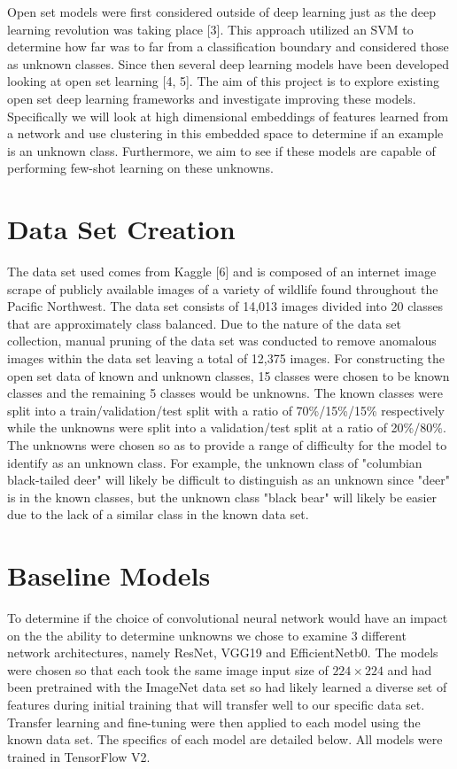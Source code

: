\documentclass[conference]{IEEEtran}
\begin{document}
Open set models were first considered outside of deep learning just as the deep learning revolution was taking place [3]. This approach utilized an SVM to determine how far was to far from a classification boundary and considered those as unknown classes. Since then several deep learning models have been developed looking at open set learning [4, 5]. The aim of this project is to explore existing open set deep learning frameworks and investigate improving these models. Specifically we will look at high dimensional embeddings of features learned from a network and use clustering in this embedded space to determine if an example is an unknown class. Furthermore, we aim to see if these models are capable of performing few-shot learning on these unknowns.

\section{Data Set Creation}

The data set used comes from Kaggle [6] and is composed of an internet image scrape of publicly available images of a variety of wildlife found throughout the Pacific Northwest. The data set consists of 14,013 images divided into 20 classes that are approximately class balanced. Due to the nature of the data set collection, manual pruning of the data set was conducted to remove anomalous images within the data set leaving a total of 12,375 images. For constructing the open set data of known and unknown classes, 15 classes were chosen to be known classes and the remaining 5 classes would be unknowns. The known classes were split into a train/validation/test split with a ratio of 70\%/15\%/15\% respectively while the unknowns were split into a validation/test split at a ratio of 20\%/80\%. The unknowns were chosen so as to provide a range of difficulty for the model to identify as an unknown class. For example, the unknown class of "columbian black-tailed deer" will likely be difficult to distinguish as an unknown since "deer" is in the known classes, but the unknown class "black bear" will likely be easier due to the lack of a similar class in the known data set.

\section{Baseline Models}

To determine if the choice of convolutional neural network would have an impact on the the ability to determine unknowns we chose to examine 3 different network architectures, namely ResNet, VGG19 and EfficientNetb0. The models were chosen so that each took the same image input size of $224 \times 224$ and had been pretrained with the ImageNet data set so had likely learned a diverse set of features during initial training that will transfer well to our specific data set. Transfer learning and fine-tuning were then applied to each model using the known data set. The specifics of each model are detailed below. All models were trained in TensorFlow V2.
\end{document}
